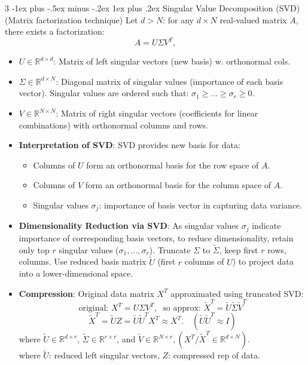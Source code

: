 \documentclass[a4paper, 9pt, landscape]{article}
\makeatletter
\renewcommand{\subsubsection}{\@startsection{subsubsection}{3}{0mm}%
                                {-1ex plus -.5ex minus -.2ex}%
                                {1ex plus .2ex}%
                                {\normalfont\small\bfseries}}
\makeatother
\begin{document}
\begin{multicols*}{3}
\subsubsection{Singular Value Decomposition (SVD) {\scriptsize (Matrix factorization technique)}}
 Let $d > N$: for any $ d \times N $ real-valued matrix $ A $, there exists a factorization:
\[
A = U \Sigma V^T,
\]
\begin{itemize}[itemsep=-1pt]
    \item $ U \in \mathbb{R}^{d \times d} $: Matrix of left singular vectors (new basis) w. orthonormal cols.
    \item $ \Sigma  \in \mathbb{R}^{d \times N} $: Diagonal matrix of singular values (importance of each basis vector). Singular values are ordered such that: $\sigma_1 \geq ... \geq \sigma_r \geq 0$.
    \item $ V \in \mathbb{R}^{N \times N} $: Matrix of right singular vectors (coefficients for linear combinations) with orthonormal columns and rows.
\item \textbf{Interpretation of SVD}: SVD provides new basis for data:
	\begin{itemize}[itemsep=-2pt, topsep=-2pt]
	    \item Columns of $ U $ form an orthonormal basis for the row space of $ A $.
	    \item Columns of $ V $ form an orthonormal basis for the column space of $ A $.
	    \item Singular values $ \sigma_j $: importance of basis vector in capturing data variance.
	\end{itemize}
\item \textbf{Dimensionality Reduction via SVD}: As singular values $ \sigma_j $ indicate importance of corresponding basis vectors, to reduce dimensionality, retain only top $ r $ singular values ($ \sigma_1, \dots, \sigma_r $). Truncate $ \Sigma $ to $ \tilde{\Sigma} $, keep first $ r $ rows, columns. Use reduced basis matrix $ \tilde{U} $ (first $ r $ columns of $ U $) to project data into a lower-dimensional space.

\item \textbf{Compression}: Original data matrix $ X^T $ approximated using truncated SVD:
\[ \text{original: } X^T = U\Sigma V^T, \hspace{3pt} \text{ so approx: } \tilde{X}^T = \tilde{U} \tilde{\Sigma} \tilde{V}^T\]
\[ \tilde{X}^T = \tilde{U} Z = \tilde{U} \tilde{U}^T X^T \approx X^T. \quad (\tilde{U} \tilde{U}^T \approx I) \]
where $ \tilde{U} \in \mathbb{R}^{d \times r} $, $ \tilde{\Sigma} \in \mathbb{R}^{r \times r} $, 
and $ \tilde{V} \in \mathbb{R}^{N \times r}, (X^T / \tilde{X}^T\in \mathbb{R}^{d \times N}) $.
\\ 
where $\tilde{U}$: reduced left singular vectors, $Z$: compressed rep of data.


\end{itemize}
\end{multicols*}
\end{document}
